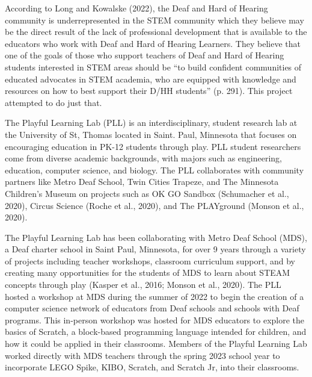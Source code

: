 \documentclass[11.5pt]{sig-alternate} %
\begin{document}
\begin{large}
According to Long and Kowalske (2022), the Deaf and Hard of Hearing community is underrepresented in the STEM community which they believe may be the direct result of the lack of professional development that is available to the educators who work with Deaf and Hard of Hearing Learners. They believe that one of the goals of those who support teachers of Deaf and Hard of Hearing students interested in STEM areas should be “to build confident communities of educated advocates in STEM academia, who are equipped with knowledge and resources on how to best support their D/HH students” (p. 291). This project attempted to do just that.

The Playful Learning Lab (PLL) is an interdisciplinary, student research lab at the University of St, Thomas located in Saint. Paul, Minnesota that focuses on encouraging education in PK-12 students through play. PLL student researchers come from diverse academic backgrounds, with majors such as engineering, education, computer science, and biology. The PLL collaborates with community partners like Metro Deaf School, Twin Cities Trapeze, and The Minnesota Children’s Museum on projects such as OK GO Sandbox (Schumacher et al., 2020), Circus Science (Roche et al., 2020), and The PLAYground (Monson et al., 2020). 

The Playful Learning Lab has been collaborating with Metro Deaf School (MDS), a Deaf charter school in Saint Paul, Minnesota, for over 9 years through a variety of projects including teacher workshops, classroom curriculum support, and by creating many opportunities for the students of MDS to learn about STEAM concepts through play (Kasper et al., 2016; Monson et al., 2020). The PLL hosted a workshop at MDS during the summer of 2022 to begin the creation of a computer science network of educators from Deaf schools and schools with Deaf programs. This in-person workshop was hosted for MDS educators to explore the basics of Scratch, a block-based programming language intended for children, and how it could be applied in their classrooms. Members of the Playful Learning Lab worked directly with MDS teachers through the spring 2023 school year to incorporate LEGO Spike, KIBO, Scratch, and  Scratch Jr, into their classrooms.


\end{large}
\end{document}
